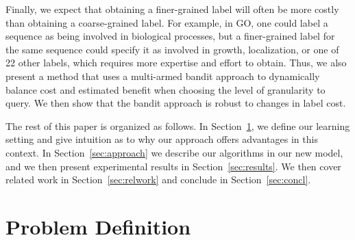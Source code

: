\documentclass[10pt,conference,compsocconf]{IEEEtran}
\begin{document}
Finally, we expect that obtaining a finer-grained
label will often be more costly than obtaining
a coarse-grained label.  For example, in GO, one could
label a sequence as being involved in biological processes, but a finer-grained
label for the same sequence could specify it as involved in growth,
localization, or one of 22 other labels, which 
requires more expertise and effort
to obtain.  Thus, we also present a method that uses a multi-armed bandit
approach to dynamically balance
cost and estimated benefit when choosing the level of granularity to
query.  We then show that the bandit approach is robust to changes in
label cost.



The rest of this paper is organized as follows.  In Section~\ref{sec:defn},
we define our learning setting and give intuition as to why
our approach offers advantages in this context.  
In Section~\ref{sec:approach} we describe
our algorithms in our new model, and we then present 
experimental results in Section~\ref{sec:results}.
We then cover related work in Section~\ref{sec:relwork} and conclude in Section~\ref{sec:concl}.

\section{Problem Definition}
\label{sec:defn}
\end{document}
